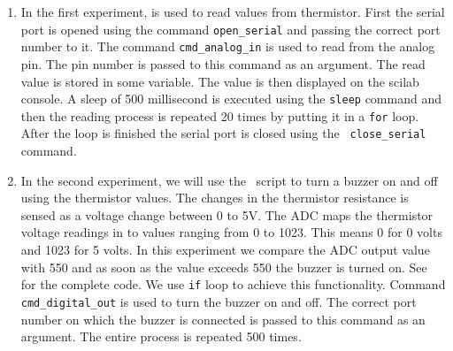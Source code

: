 \begin{enumerate}
\item In the first experiment,  is used to read
  values from thermistor. First the serial port is opened using the
  command {\tt open\_serial} and passing the correct port number to
  it. The command {\tt cmd\_analog\_in} is used to read from the
  analog pin. The pin number is passed to this command as an
  argument. The read value is stored in some variable. The value is
  then displayed on the scilab console. A sleep of 500 millisecond is
  executed using the {\tt sleep} command and then the reading process
  is repeated 20 times by putting it in a {\tt for} loop. After the
  loop is finished the serial port is closed using the {\tt
    close\_serial} command.

\item In the second experiment, we will use the \scilab\ script to
  turn a buzzer on and off using the thermistor values. The changes in
  the thermistor resistance is sensed as a voltage change between 0 to
  5V. The ADC maps the thermistor voltage readings in to values
  ranging from 0 to 1023. This means 0 for 0 volts and 1023 for 5
  volts. In this experiment we compare the ADC output value with 550
  and as soon as the value exceeds 550 the buzzer is turned on. See
   for the complete code. We use {\tt if}
  loop to achieve this functionality. Command {\tt cmd\_digital\_out}
  is used to turn the buzzer on and off.  The correct port number on
  which the buzzer is connected is passed to this command as an
  argument. The entire process is repeated 500 times.
\end{enumerate}


